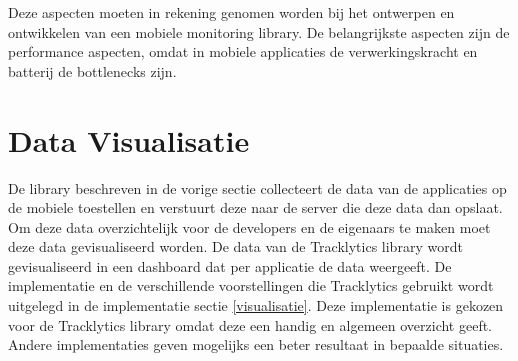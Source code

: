 Deze aspecten moeten in rekening genomen worden bij het ontwerpen en ontwikkelen van een mobiele monitoring library. De belangrijkste aspecten zijn de performance aspecten, omdat in mobiele applicaties de verwerkingskracht en batterij de bottlenecks zijn. 


\section{Data Visualisatie}
De library beschreven in de vorige sectie collecteert de data van de applicaties op de mobiele toestellen en verstuurt deze naar de server die deze data dan opslaat. Om deze data overzichtelijk voor de developers en de eigenaars te maken moet deze data gevisualiseerd worden. De data van de Tracklytics library wordt gevisualiseerd in een dashboard dat per applicatie de data weergeeft. De implementatie en de verschillende voorstellingen die Tracklytics gebruikt wordt uitgelegd in de implementatie sectie \ref{visualisatie}. Deze implementatie is gekozen voor de Tracklytics library omdat deze een handig en algemeen overzicht geeft. Andere implementaties geven mogelijks een beter resultaat in bepaalde situaties. 

